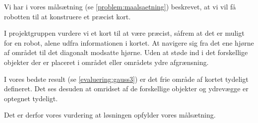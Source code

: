 Vi har i vores målsætning (se \cref{problem:maalsaetning}) beskrevet, at vi vil få robotten til at konstruere et præcist kort.

I projektgruppen vurdere vi et kort til at være præcist, såfrem at det er muligt for en robot, alene udfra informationen i kortet.
At navigere sig fra det ene hjørne af området til det diagonalt modsatte hjørne.
Uden at støde ind i det forskellige objekter der er placeret i området eller områdets ydre afgrænsning.

I vores bedste result (se \cref{evaluering:gauss3}) er det frie område af kortet tydeligt defineret.
Det ses desuden at omridset af de forskellige objekter og ydrevægge er optegnet tydeligt.

Det er derfor vores vurdering at løsningen opfylder vores målsætning. 


